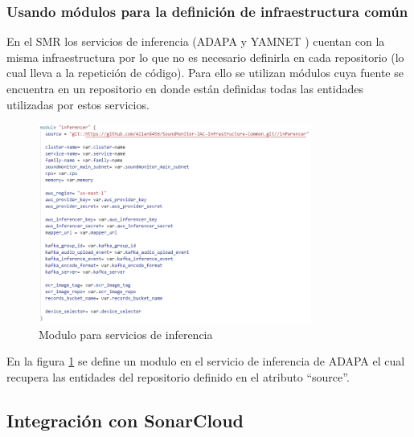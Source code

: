 \subsubsection{Usando módulos para la definición de infraestructura común}

En el SMR los servicios de inferencia (ADAPA \cite{EstebanInferencerAdapa2020} y YAMNET \cite{EstebanYAMNET2021}) cuentan con la misma infraestructura por lo que no es necesario definirla en cada repositorio (lo cual lleva a la repetición de código). Para ello se utilizan módulos cuya fuente se encuentra en un repositorio \cite{EstebanInferencerCommon2021} en donde están definidas todas las entidades utilizadas por estos servicios.

\begin{figure}[H]
	\centering
	\includegraphics[width=0.8\textwidth]{bibliografia/Imagenes/moduleInferencer.png}
	\caption{Modulo para servicios de inferencia}
	\label{moduleTerraform}
\end{figure}

En la figura \ref{moduleTerraform} se define un modulo en el servicio de inferencia de ADAPA el cual recupera las entidades del repositorio definido en el atributo ``source''.

\subsection{Integración con SonarCloud}